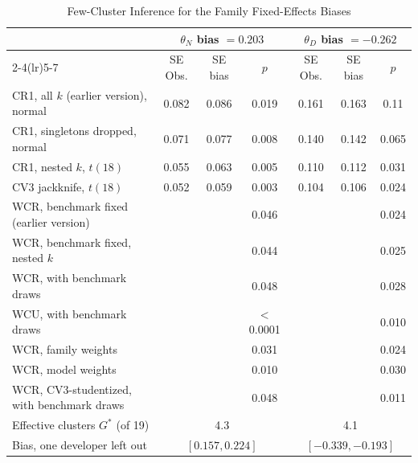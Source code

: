 \begin{table}[tp]
\centering
\caption{Few-Cluster Inference for the Family Fixed-Effects Biases}
\label{tab:app-inference}
\footnotesize
\setlength{\tabcolsep}{3pt}
\begin{tabular}{@{}l ccc ccc@{}}
\toprule
 & \multicolumn{3}{c}{$\theta_N$ bias $=0.203$} & \multicolumn{3}{c}{$\theta_D$ bias $=-0.262$} \\
\cmidrule(lr){2-4}\cmidrule(lr){5-7}
 & SE Obs. & SE bias & $p$ & SE Obs. & SE bias & $p$ \\
\midrule
CR1, all $k$ (earlier version), normal & 0.082 & 0.086 & 0.019 & 0.161 & 0.163 & 0.11 \\
CR1, singletons dropped, normal & 0.071 & 0.077 & 0.008 & 0.140 & 0.142 & 0.065 \\
CR1, nested $k$, $t(18)$ & 0.055 & 0.063 & 0.005 & 0.110 & 0.112 & 0.031 \\
CV3 jackknife, $t(18)$ & 0.052 & 0.059 & 0.003 & 0.104 & 0.106 & 0.024 \\
\addlinespace[2pt]
WCR, benchmark fixed (earlier version) &  &  & 0.046 &  &  & 0.024 \\
WCR, benchmark fixed, nested $k$ &  &  & 0.044 &  &  & 0.025 \\
WCR, with benchmark draws &  &  & 0.048 &  &  & 0.028 \\
WCU, with benchmark draws &  &  & $<$0.0001 &  &  & 0.010 \\
WCR, family weights &  &  & 0.031 &  &  & 0.024 \\
WCR, model weights &  &  & 0.010 &  &  & 0.030 \\
WCR, CV3-studentized, with benchmark draws &  &  & 0.048 &  &  & 0.011 \\
\addlinespace[2pt]
Effective clusters $G^*$ (of 19) & \multicolumn{3}{c}{4.3} & \multicolumn{3}{c}{4.1} \\
Bias, one developer left out & \multicolumn{3}{c}{$[0.157,0.224]$} & \multicolumn{3}{c}{$[-0.339,-0.193]$} \\
\bottomrule
\end{tabular}


\end{table}
